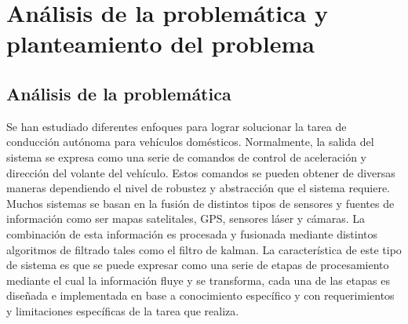 \documentclass[12pt,letterpaper]{article}
\begin{document}

\section{Análisis de la problemática y \\
planteamiento del problema}
\subsection{Análisis de la problemática}

Se han estudiado diferentes enfoques para lograr solucionar la tarea de 
conducción autónoma para vehículos domésticos. Normalmente, la salida del 
sistema se expresa como una serie de comandos de control de aceleración y dirección 
del volante del vehículo. Estos comandos se pueden obtener de diversas maneras dependiendo 
el nivel de robustez y abstracción que el sistema requiere. Muchos sistemas 
se basan en la fusión de distintos tipos de sensores y fuentes de información como ser 
mapas satelitales, GPS, sensores láser y cámaras. La combinación de esta información 
es procesada y fusionada mediante distintos algoritmos de filtrado tales como el filtro de kalman. 
La característica de este tipo de sistema es que se puede expresar como una serie de etapas 
de procesamiento mediante el cual la información fluye y se transforma, cada una de las etapas es 
diseñada e implementada en base a conocimiento específico y con requerimientos y limitaciones específicas 
de la tarea que realiza. 

\end{document}
